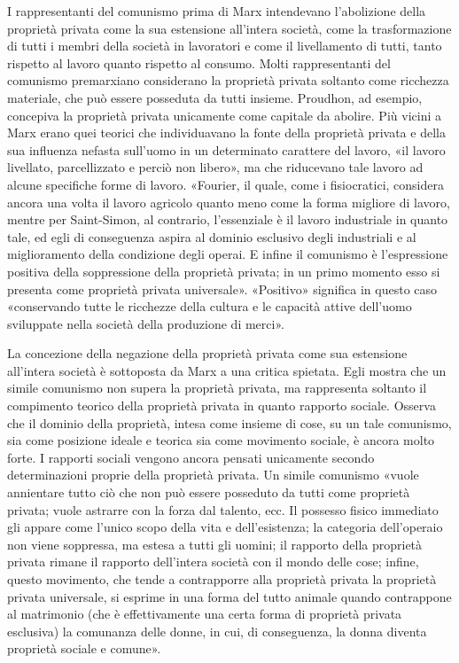 \documentclass[../main]{subfiles}
\begin{document}
I rappresentanti del comunismo prima di Marx intendevano l'abolizione della proprietà privata come la sua estensione all'intera società, come la trasformazione di tutti i membri della società in lavoratori e come il livellamento di tutti, tanto rispetto al lavoro quanto rispetto al consumo. Molti rappresentanti del comunismo premarxiano considerano la proprietà privata soltanto come ricchezza materiale, che può essere posseduta da tutti insieme. Proudhon, ad esempio, concepiva la proprietà privata unicamente come capitale da abolire. Più vicini a Marx erano quei teorici che individuavano la fonte della proprietà privata e della sua influenza nefasta sull'uomo in un determinato carattere del lavoro, «il lavoro livellato, parcellizzato e perciò non libero», ma che riducevano tale lavoro ad alcune specifiche forme di lavoro. «Fourier, il quale, come i fisiocratici, considera ancora una volta il lavoro agricolo quanto meno come la forma migliore di lavoro, mentre per Saint-Simon, al contrario, l'essenziale è il lavoro industriale in quanto tale, ed egli di conseguenza aspira al dominio esclusivo degli industriali e al miglioramento della condizione degli operai. E infine il comunismo è l'espressione positiva della soppressione della proprietà privata; in un primo momento esso si presenta come proprietà privata universale». «Positivo» significa in questo caso «conservando tutte le ricchezze della cultura e le capacità attive dell'uomo sviluppate nella società della produzione di merci».

La concezione della negazione della proprietà privata come sua estensione all'intera società è sottoposta da Marx a una critica spietata. Egli mostra che un simile comunismo non supera la proprietà privata, ma rappresenta soltanto il compimento teorico della proprietà privata in quanto rapporto sociale. Osserva che il dominio della proprietà, intesa come insieme di cose, su un tale comunismo, sia come posizione ideale e teorica sia come movimento sociale, è ancora molto forte. I rapporti sociali vengono ancora pensati unicamente secondo determinazioni proprie della proprietà privata. Un simile comunismo «vuole annientare tutto ciò che non può essere posseduto da tutti come proprietà privata; vuole astrarre con la forza dal talento, ecc. Il possesso fisico immediato gli appare come l'unico scopo della vita e dell'esistenza; la categoria dell'operaio non viene soppressa, ma estesa a tutti gli uomini; il rapporto della proprietà privata rimane il rapporto dell'intera società con il mondo delle cose; infine, questo movimento, che tende a contrapporre alla proprietà privata la proprietà privata universale, si esprime in una forma del tutto animale quando contrappone al matrimonio (che è effettivamente una certa forma di proprietà privata esclusiva) la comunanza delle donne, in cui, di conseguenza, la donna diventa proprietà sociale e comune».
\end{document}
